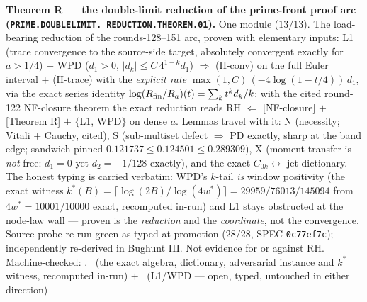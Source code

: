 \documentclass[11pt,a4paper]{article}
\theoremstyle{definition}
\begin{document}
\par\smallskip\noindent\textbf{Theorem R --- the double-limit
reduction of the prime-front proof arc
(\texttt{PRIME.\allowbreak DOUBLELIMIT.\allowbreak
REDUCTION.\allowbreak THEOREM.01}).}
One module ($13/13$).  The load-bearing reduction of the
rounds-128--151 arc, proven with elementary inputs: L1 (trace
convergence to the source-side target, absolutely convergent
exactly for $a > 1/4$) $+$ WPD ($d_1 > 0$,
$|d_k| \le C\,4^{1-k} d_1$) $\Rightarrow$ (H-conv) on the full
Euler interval $+$ (H-trace) with the \emph{explicit rate}
$\max(1, C)\,(-4\log(1 - t/4))\,d_1$, via the exact series
identity $\log(R_{\rm fin}/R_a)(t) = \sum_k t^k d_k/k$; with the
cited round-122 NF-closure theorem the exact reduction reads
RH $\Leftarrow$ [NF-closure] $+$ [Theorem R] $+$
$\{$L1, WPD$\}$ on dense $a$.  Lemmas travel with it: N
(necessity; Vitali $+$ Cauchy, cited), S (sub-multiset defect
$\Rightarrow$ PD exactly, sharp at the band edge; sandwich
pinned $0.121737 \le 0.124501 \le 0.289309$), X (moment transfer
is \emph{not} free: $d_1 = 0$ yet $d_2 = -1/128$ exactly), and
the exact $C_{0k} \leftrightarrow$ jet dictionary.  The honest
typing is carried verbatim: WPD's $k$-tail \emph{is} window
positivity (the exact witness $k^*(B) =
\lceil\log(2B)/\log(4w^*)\rceil = 29959/76013/145094$ from
$4w^* = 10001/10000$ exact, recomputed in-run) and L1 stays
obstructed at the node-law wall --- proven is the
\emph{reduction} and the \emph{coordinate}, not the convergence.
Source probe re-run green as typed at promotion ($28/28$,
SPEC \texttt{0c77ef7c}); independently re-derived in Bughunt III.
Not evidence for or against RH.
Machine-checked: .
\mE\ (the exact algebra, dictionary, adversarial instance and
$k^*$ witness, recomputed in-run) $+$ \mO\ (L1/WPD --- open,
typed, untouched in either direction)
\par\smallskip
\end{document}
